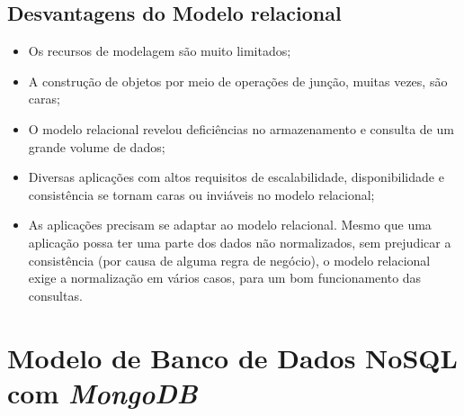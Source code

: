 \subsection{Desvantagens do Modelo relacional}

    
\begin{itemize}
    \item Os recursos de modelagem são muito limitados;
        
    \item A construção de objetos por meio de operações de junção, muitas vezes, são caras;
        
    \item O modelo relacional revelou deficiências no armazenamento e consulta de um grande volume de dados;
        
    \item Diversas aplicações com altos requisitos de escalabilidade, disponibilidade e consistência se tornam caras ou inviáveis no modelo relacional;
        
    \item As aplicações precisam se adaptar ao modelo relacional. Mesmo que uma aplicação possa ter uma parte dos dados não normalizados, sem prejudicar a consistência (por causa de alguma regra de negócio), o modelo relacional exige a normalização em vários casos, para um bom funcionamento das consultas.
\end{itemize}

\section{Modelo de Banco de Dados NoSQL com \textit{MongoDB}}



